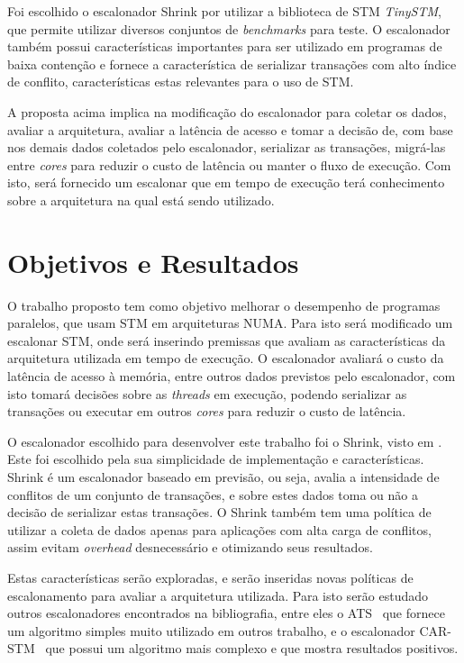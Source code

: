 \documentclass[diss-proposta,nocipinfo]{texufpel}
\begin{document}
Foi escolhido o escalonador Shrink por utilizar a biblioteca de STM \emph{TinySTM}, que permite utilizar diversos conjuntos de \emph{benchmarks} para teste. O escalonador também possui características importantes para ser utilizado em programas de baixa contenção e fornece a característica de serializar transações com alto índice de conflito, características estas relevantes para o uso de STM.

A proposta acima implica na modificação do escalonador para coletar os dados, avaliar a arquitetura, avaliar a latência de acesso e tomar a decisão de, com base nos demais dados coletados pelo escalonador, serializar as transações, migrá-las entre \emph{cores} para reduzir o custo de latência ou manter o fluxo de execução. Com isto, será fornecido um escalonar que em tempo de execução terá conhecimento sobre a arquitetura na qual está sendo utilizado.

\chapter{Objetivos e Resultados}

O trabalho proposto tem como objetivo melhorar o desempenho de programas paralelos, que usam STM em arquiteturas NUMA. Para isto será modificado um escalonar STM, onde será inserindo premissas que avaliam as características da arquitetura utilizada em tempo de execução. O escalonador avaliará o custo da latência de acesso à memória, entre outros dados previstos pelo escalonador, com isto tomará decisões sobre as \emph{threads} em execução, podendo serializar as transações ou executar em outros \emph{cores} para reduzir o custo de latência.

O escalonador escolhido para desenvolver este trabalho foi o Shrink, visto em \cite{dragojevic09}. Este foi escolhido pela sua simplicidade de implementação e características. Shrink é um escalonador baseado em previsão, ou seja, avalia a intensidade de conflitos de um conjunto de transações, e sobre estes dados toma ou não a decisão de serializar estas transações. O Shrink também tem uma política de utilizar a coleta de dados apenas para aplicações com alta carga de conflitos, assim evitam \emph{overhead} desnecessário e otimizando seus resultados.

Estas características serão exploradas, e serão inseridas novas políticas de escalonamento para avaliar a arquitetura utilizada. Para isto serão estudado outros escalonadores encontrados na bibliografia, entre eles o ATS~\cite{yoo08} que fornece um algoritmo simples muito utilizado em outros trabalho, e o escalonador CAR-STM~\cite{dolev08} que possui um algoritmo mais complexo e que mostra resultados positivos.
\end{document}
